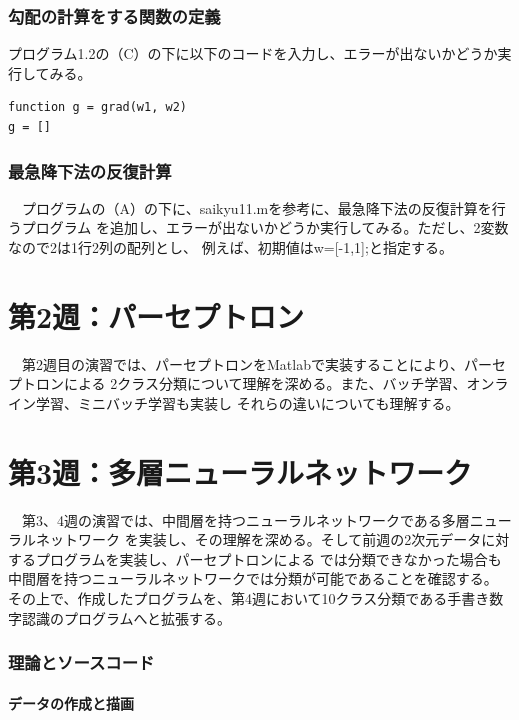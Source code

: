 \documentclass[10pt,a4paper,titlepage]{jreport} %
\begin{document}
\subsection{勾配の計算をする関数の定義}

プログラム1.2の（C）の下に以下のコードを入力し、エラーが出ないかどうか実行してみる。

\begin{lstlisting}[caption=saikyu21]
%% 勾配の計算
function g = grad(w1, w2)
g = []
\end{lstlisting}

\subsection{最急降下法の反復計算}

　プログラムの（A）の下に、saikyu11.mを参考に、最急降下法の反復計算を行うプログラム
を追加し、エラーが出ないかどうか実行してみる。ただし、2変数なので2は1行2列の配列とし、
例えば、初期値はw=[-1,1];と指定する。

\chapter{第2週：パーセプトロン}
　第2週目の演習では、パーセプトロンをMatlabで実装することにより、パーセプトロンによる
2クラス分類について理解を深める。また、バッチ学習、オンライン学習、ミニバッチ学習も実装し
それらの違いについても理解する。

\chapter{第3週：多層ニューラルネットワーク}
　第3、4週の演習では、中間層を持つニューラルネットワークである多層ニューラルネットワーク
を実装し、その理解を深める。そして前週の2次元データに対するプログラムを実装し、パーセプトロンによる
では分類できなかった場合も中間層を持つニューラルネットワークでは分類が可能であることを確認する。
その上で、作成したプログラムを、第4週において10クラス分類である手書き数字認識のプログラムへと拡張する。

\subsection{理論とソースコード}

\subsubsection{データの作成と描画}
\end{document}
